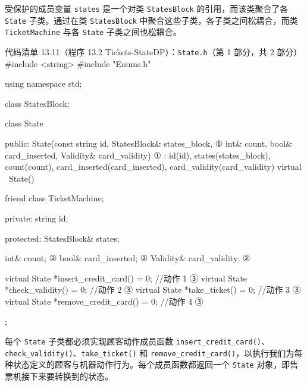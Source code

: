 受保护的成员变量 \texttt{states} 是一个对类 \texttt{States\allowbreak{}Block} 的引用，而该类聚合了各 \texttt{State} 子类。通过在类 \texttt{States\allowbreak{}Block} 中聚合这些子类，各子类之间松耦合，而类 \texttt{Ticket\allowbreak{}Machine} 与各 \texttt{State} 子类之间也松耦合。

\begin{codeboxt}{代码清单 13.11（程序 13.2 Tickets-StateDP）：\texttt{State.h}（第 1 部分，共 2 部分）}
#include <string>
#include "Enums.h"

using namespace std;

class StatesBlock;

class State
{
public:
    State(const string id, StatesBlock& states_block,               ①
          int& count, bool& card_inserted, Validity& card_validity) ①
        : id(id), states(states_block),
          count(count), card_inserted(card_inserted),
          card_validity(card_validity) {}
    virtual ~State() {}

    friend class TicketMachine;

private:
    string id;

protected:
    StatesBlock& states;

    int&      count;                                                ②
    bool&     card_inserted;                                        ②
    Validity& card_validity;                                        ②

    virtual State *insert_credit_card() = 0;  //动作 1           ③
    virtual State *check_validity()     = 0;  //动作 2           ③
    virtual State *take_ticket()        = 0;  //动作 3           ③
    virtual State *remove_credit_card() = 0;  //动作 4           ③
};
\end{codeboxt}
\par
{}\par
{}\par

每个 \texttt{State} 子类都必须实现顾客动作成员函数 \texttt{insert\_\allowbreak{}credit\_\allowbreak{}card(\allowbreak{})\allowbreak{}}、\texttt{check\_\allowbreak{}validity(\allowbreak{})\allowbreak{}}、\texttt{take\_\allowbreak{}ticket(\allowbreak{})\allowbreak{}} 和 \texttt{remove\_\allowbreak{}credit\_\allowbreak{}card(\allowbreak{})\allowbreak{}}，以执行我们为每种状态定义的顾客与机器动作行为。每个成员函数都返回一个 \texttt{State} 对象，即售票机接下来要转换到的状态。

